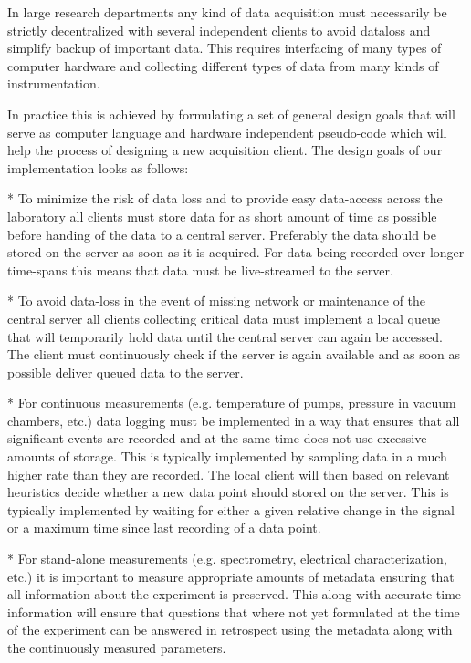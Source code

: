 In large research departments any kind of data acquisition must necessarily be
strictly decentralized with several independent clients to avoid dataloss and
simplify backup of important data. This requires interfacing of many types of
computer hardware and collecting different types of data from many kinds of
instrumentation.

In practice this is achieved by formulating a set of general design goals that
will serve as computer language and hardware independent pseudo-code which
will help the process of designing a new acquisition client. The design goals
of our implementation looks as follows:

* To minimize the risk of data loss and to provide easy data-access across the
  laboratory all clients must store data for as short amount of time as
  possible before handing of the data to a central server. Preferably the data
  should be stored on the server as soon as it is acquired. For data being
  recorded over longer time-spans this means that data must be live-streamed to
  the server.

* To avoid data-loss in the event of missing network or maintenance of the
  central server all clients collecting critical data must implement a local
  queue that will temporarily hold data until the central server can again be
  accessed. The client must continuously check if the server is again available
  and as soon as possible deliver queued data to the server.

* For continuous measurements (e.g. temperature of pumps, pressure in vacuum
  chambers, etc.) data logging must be implemented in a way that ensures that
  all significant events are recorded and at the same time does not use
  excessive amounts of storage. This is typically implemented by sampling data
  in a much higher rate than they are recorded. The local client will then
  based on relevant heuristics decide whether a new data point should stored on
  the server. This is typically implemented by waiting for either a given
  relative change in the signal or a maximum time since last recording of a
  data point.
  
* For stand-alone measurements (e.g. spectrometry, electrical characterization,
  etc.) it is important to measure appropriate amounts of metadata ensuring
  that all information about the experiment is preserved. This along with
  accurate time information will ensure that questions that where not yet
  formulated at the time of the experiment can be answered in retrospect using
  the metadata along with the continuously measured parameters.
  
